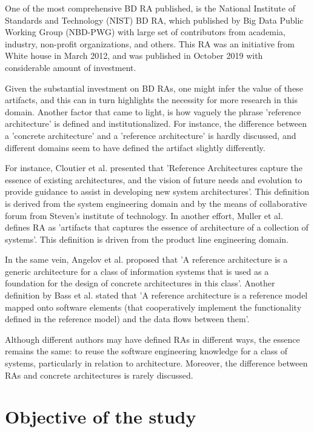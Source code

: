 \documentclass{ieeeaccess}
\begin{document}
One of the most comprehensive BD RA published, is the National Institute of Standards and Technology (NIST) BD RA, which published by Big Data Public Working Group (NBD-PWG) with large set of contributors from academia, industry, non-profit organizations, and others. This RA was an initiative from White house in March 2012, and was published in October 2019 with considerable amount of investment. 

Given the substantial investment on BD RAs, one might infer the value of these artifacts, and this can in turn highlights the necessity for more research in this domain. Another factor that came to light, is how vaguely the phrase 'reference architecture' is defined and institutionalized. For instance, the difference between a 'concrete architecture' and a 'reference architecture' is hardly discussed, and different domains seem to have defined the artifact slightly differently. 

For instance, Cloutier et al. \cite{Cloutier} presented that 'Reference Architectures capture the essence of existing architectures, and the vision of future needs and evolution to provide guidance to assist in developing new system architectures'. This definition is derived from the system engineering domain and by the means of collaborative forum from Steven's institute of technology. In another effort, Muller et al. \cite{muller2008reference} defines RA as 'artifacts that captures the essence of architecture of a collection of systems'. This definition is driven from the product line engineering domain. 

In the same vein, Angelov et al. \cite{angelov2009classification} proposed that 'A reference architecture is a generic architecture for a class of information systems that is used as a foundation for the design of concrete architectures in this class'. Another definition by Bass et al. \cite{Bass} stated that 'A reference architecture is a reference model mapped onto software elements (that cooperatively implement the functionality defined in the reference model) and the data flows between them'. 

Although different authors may have defined RAs in different ways, the essence remains the same: to reuse the software engineering knowledge for a class of systems, particularly in relation to architecture. Moreover, the difference between RAs and concrete architectures is rarely discussed. 

\section{Objective of the study}
\end{document}
